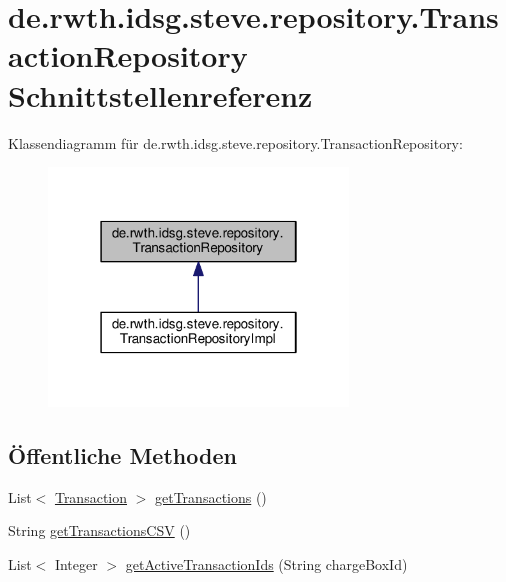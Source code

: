 \hypertarget{interfacede_1_1rwth_1_1idsg_1_1steve_1_1repository_1_1_transaction_repository}{\section{de.\-rwth.\-idsg.\-steve.\-repository.\-Transaction\-Repository Schnittstellenreferenz}
\label{interfacede_1_1rwth_1_1idsg_1_1steve_1_1repository_1_1_transaction_repository}
}


Klassendiagramm für de.\-rwth.\-idsg.\-steve.\-repository.\-Transaction\-Repository\-:
\nopagebreak
\begin{figure}[H]
\begin{center}
\leavevmode
\includegraphics[width=226pt]{interfacede_1_1rwth_1_1idsg_1_1steve_1_1repository_1_1_transaction_repository__inherit__graph}
\end{center}
\end{figure}
\subsection*{Öffentliche Methoden}
\begin{DoxyCompactItemize}
\item 
List$<$ \hyperlink{classde_1_1rwth_1_1idsg_1_1steve_1_1repository_1_1dto_1_1_transaction}{Transaction} $>$ \hyperlink{interfacede_1_1rwth_1_1idsg_1_1steve_1_1repository_1_1_transaction_repository_a58096f1db321d5651802b06b19b149d2}{get\-Transactions} ()
\item 
String \hyperlink{interfacede_1_1rwth_1_1idsg_1_1steve_1_1repository_1_1_transaction_repository_a5b5acf6500d2e37f0f5cc6a68efdbab4}{get\-Transactions\-C\-S\-V} ()
\item 
List$<$ Integer $>$ \hyperlink{interfacede_1_1rwth_1_1idsg_1_1steve_1_1repository_1_1_transaction_repository_af2452533bc153cc48dd5a8205ed45fd1}{get\-Active\-Transaction\-Ids} (String charge\-Box\-Id)
\end{DoxyCompactItemize}


